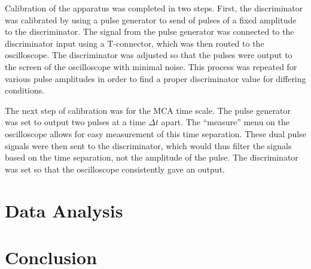 \documentclass[%
 aip,
 amsmath,amssymb,
 reprint,%
floatfix,
]{revtex4-1}
\begin{document}
Calibration of the apparatus was completed in two steps. First, the discriminator was calibrated by using a pulse generator to send of pulses of a fixed amplitude to the discriminator. The signal from the pulse generator was connected to the discriminator input using a T-connector, which was then routed to the oscilloscope. The discriminator was adjusted so that the pulses were output to the screen of the oscilloscope with minimal noise. This process was repeated for various pulse amplitudes in order to find a proper discriminator value for differing conditions.

The next step of calibration was for the MCA time scale. The pulse generator was set to output two pulses at a time $\Delta t$ apart. The “measure” menu on the oscilloscope allows for easy measurement of this time separation. These dual pulse signals were then sent to the discriminator, which would thus filter the signals based on the time separation, not the amplitude of the pulse. The discriminator was set so that the oscilloscope consistently gave an output.

\section{\label{sec:level4}Data Analysis}


\section{\label{sec:level5}Conclusion}


\nocite{*}
\end{document}
